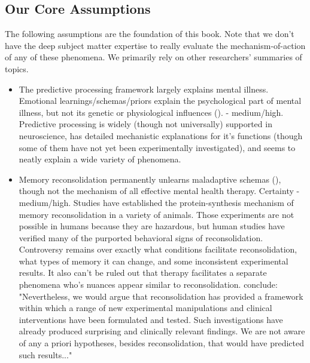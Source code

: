 \documentclass[12pt,letterpaper]{book}
\begin{document}
\subsection*{Our Core Assumptions}
The following assumptions are the foundation of this book. Note that we don't have the deep subject matter expertise to really evaluate the mechanism-of-action of any of these phenomena. We primarily rely on other researchers' summaries of topics.
\begin{itemize}
	\item The predictive processing framework largely explains mental illness. Emotional learnings/schemas/priors explain the psychological part of mental illness, but not its genetic or physiological influences (\textcite{aizenbud2025neuralmechanismspredictiveprocessing,clark2015surfing,Clark_Watson_Friston_2018,eckerUnlocking,laneReconsolidation}). - medium/high. Predictive processing is widely (though not universally) supported in neuroscience, has detailed mechanistic explanations for it's functions (though some of them have not yet been experimentally investigated), and seems to neatly explain a wide variety of phenomena.
	\item Memory reconsolidation permanently unlearns maladaptive schemas (\textcite{eckerUnlocking,laneReconsolidation,elsey2018human}), though not the mechanism of all effective mental health therapy. Certainty - medium/high. Studies have established the protein-synthesis mechanism of memory reconsolidation in a variety of animals. Those experiments are not possible in humans because they are hazardous, but human studies have verified many of the purported behavioral signs of reconsolidation. Controversy remains over exactly what conditions facilitate reconsolidation, what types of memory it can change, and some inconsistent experimental results. It also can't be ruled out that therapy facilitates a separate phenomena who's nuances appear similar to reconsolidation. \textcite{elsey2018human} conclude: "Nevertheless, we would argue that reconsolidation has provided a framework within which a range of new experimental manipulations and clinical interventions have been formulated and tested. Such investigations have already produced surprising and clinically relevant findings. We are not aware of any a priori hypotheses, besides reconsolidation, that would have predicted such results..."

\end{itemize}
\end{document}
